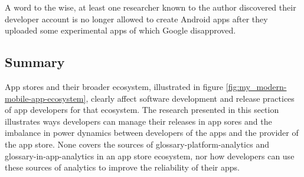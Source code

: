 A word to the wise, at least one researcher known to the author discovered their developer account is no longer allowed to create Android apps after they uploaded some experimental apps of which Google disapproved.


\subsection{Summary} %
App stores and their broader ecosystem, illustrated in figure \ref{fig:my_modern-mobile-app-ecosystem}, clearly affect software development and release practices of app developers for that ecosystem. The research presented in this section illustrates ways developers can manage their releases in app sores and the imbalance in power dynamics between developers of the apps and the provider of the app store. None covers the sources of \gls{glossary-platform-analytics} and \gls{glossary-in-app-analytics} in an app store ecosystem, nor how developers can use these sources of analytics to improve the reliability of their apps. 

